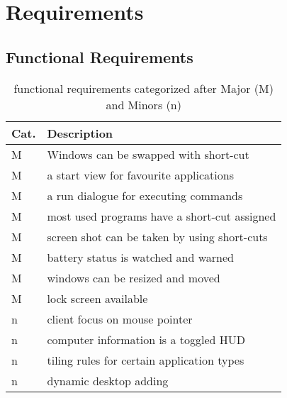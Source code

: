 \section{Requirements}
		\subsection{Functional Requirements}
        \begin{table}[H]
            \centering
            \begin{longtabu}to \linewidth {l|X}
                \textbf{Cat.} & \textbf{Description}\\ \hline
                M & Windows can be swapped with short-cut\\ \hline
                M & a start view for favourite applications\\ \hline
                M & a run dialogue for executing commands\\ \hline
                M & most used programs have a short-cut assigned\\ \hline
                M & screen shot can be taken by using short-cuts\\ \hline
                M & battery status is watched and warned\\ \hline
                M & windows can be resized and moved\\ \hline
                M & lock screen available\\ \hline
                n & client focus on mouse pointer\\ \hline
                n & computer information is a toggled HUD\\ \hline
                n & tiling rules for certain application types\\ \hline
                n & dynamic desktop adding\\ \hline
            \end{longtabu}
            \caption{functional requirements categorized after Major (M) and Minors (n)}
        \end{table}
		
